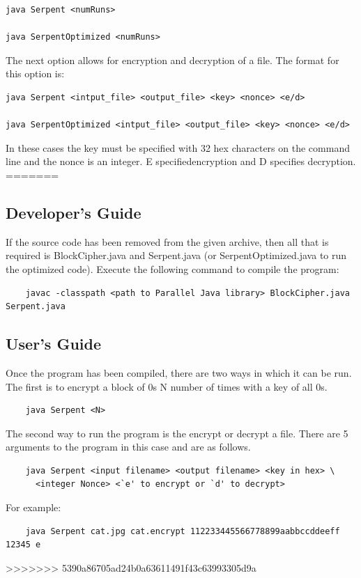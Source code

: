 \documentclass[12pt]{article} %
\begin{document}
\begin{lstlisting}
java Serpent <numRuns>

java SerpentOptimized <numRuns>
\end{lstlisting}

The next option allows for encryption and decryption of a file. The format for this option is:

\begin{lstlisting}
java Serpent <intput_file> <output_file> <key> <nonce> <e/d>

java SerpentOptimized <intput_file> <output_file> <key> <nonce> <e/d>
\end{lstlisting}

In these cases the key must be specified with 32 hex characters on the command line and the nonce is an integer. E specified\s encryption and D specifies decryption.
=======
\subsection{Developer's Guide}
  If the source code has been removed from the given archive, then all that is required is BlockCipher.java and Serpent.java (or SerpentOptimized.java to run the optimized code).  Execute the following command to compile the program:
  \begin{verbatim}
  	javac -classpath <path to Parallel Java library> BlockCipher.java Serpent.java
  \end{verbatim}
  
\subsection{User's Guide}
  Once the program has been compiled, there are two ways in which it can be run.  The first is to encrypt a block of 0s N number of times with a key of all 0s.
  \begin{verbatim}
  	java Serpent <N>
  \end{verbatim}
  The second way to run the program is the encrypt or decrypt a file.  There are 5 arguments to the program in this case and are as follows.
  \begin{verbatim}
  	java Serpent <input filename> <output filename> <key in hex> \
  	  <integer Nonce> <`e' to encrypt or `d' to decrypt>
  \end{verbatim}
  For example:
  \begin{verbatim}
  	java Serpent cat.jpg cat.encrypt 112233445566778899aabbccddeeff 12345 e
  \end{verbatim}
>>>>>>> 5390a86705ad24b0a63611491f43c63993305d9a
\end{document}

